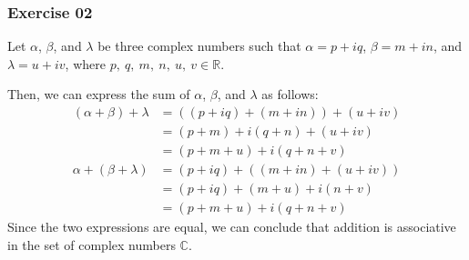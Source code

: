 \subsubsection*{Exercise 02}

\begin{flushleft}
Let $\alpha$, $\beta$, and $\lambda$ be three complex numbers such that $\alpha = p + iq$, $\beta  = m + in$, and $\lambda = u + iv$, where $p,\ q,\ m,\ n,\ u,\ v \in \mathbb{R}$.

Then, we can express the sum of $\alpha$, $\beta$, and $\lambda$ as follows:
\begin{align*}
(\alpha + \beta) + \lambda &= ((p + iq) + (m + in)) + (u + iv) \\
                           &= (p + m) + i(q + n) + (u + iv)    \\
                           &= (p + m + u) + i(q + n + v)       \\
\alpha + (\beta + \lambda) &= (p + iq) + ((m + in) + (u + iv)) \\
                           &= (p + iq) + (m + u) + i(n + v)    \\
                           &= (p + m + u) + i(q + n + v)
\end{align*}
Since the two expressions are equal, we can conclude that addition is associative in the set of complex numbers $\mathbb{C}$.
\end{flushleft}